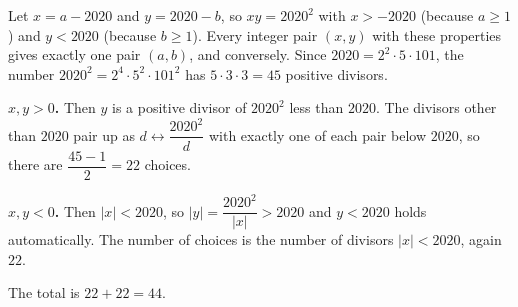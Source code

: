 Let $x=a-2020$ and $y=2020-b$, so $xy=2020^2$ with $x>-2020$ (because $a\ge1$) and $y<2020$ (because $b\ge1$). Every integer pair $(x,y)$ with these properties gives exactly one pair $(a,b)$, and conversely. Since $2020=2^2\cdot5\cdot101$, the number $2020^2=2^4\cdot5^2\cdot101^2$ has $5\cdot3\cdot3=45$ positive divisors.

\textbf{$x,y>0$.} Then $y$ is a positive divisor of $2020^2$ less than $2020$. The divisors other than $2020$ pair up as $d\leftrightarrow\dfrac{2020^2}{d}$ with exactly one of each pair below $2020$, so there are $\dfrac{45-1}{2}=22$ choices.

\textbf{$x,y<0$.} Then $|x|<2020$, so $|y|=\dfrac{2020^2}{|x|}>2020$ and $y<2020$ holds automatically. The number of choices is the number of divisors $|x|<2020$, again $22$.

The total is $22+22=\boxed{44}$.
